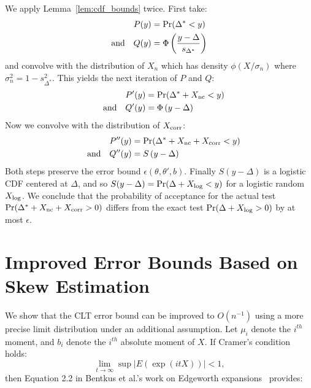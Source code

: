 \documentclass[twoside]{article} \usepackage{aistats2017}
\begin{document}
We apply Lemma~\ref{lem:cdf_bounds} twice. First take:
\begin{equation}
\begin{split}
    P(y) & = {\rm Pr}(\Delta^* < y) \\
     {\rm and} \quad Q(y) & = \Phi\left(\frac{y-\Delta}{s_{\Delta^*}}\right)
\end{split}
\end{equation}
and convolve with the distribution of $X_n$ which has density $\phi(X/\sigma_n)$
where $\sigma_n^2 = 1 - s^2_{\Delta^*}$. This yields the next iteration of $P$
and $Q$:
\begin{equation}
\begin{split}
    P'(y) & = {\rm Pr}(\Delta^*+X_{\rm nc} < y) \\
    \quad {\rm and}\quad Q'(y) & = \Phi\left({y-\Delta}\right)
\end{split}
\end{equation}
Now we convolve with the distribution of $X_{\rm corr}$:
\begin{equation}
\begin{split}
    P''(y) & = {\rm Pr}(\Delta^*+X_{\rm nc}+X_{\rm corr} < y) \\
    \quad {\rm and}\quad Q''(y) & = S\left({y-\Delta}\right)
\end{split}
\end{equation}
Both steps preserve the error bound $\epsilon(\theta,\theta',b)$. Finally
$S(y-\Delta)$ is a logistic CDF centered at $\Delta$, and so $S(y-\Delta) = {\rm
Pr}(\Delta + X_{\rm log} < y)$ for a logistic random $X_{\rm log}$. We conclude
that the probability of acceptance for the actual test ${\rm Pr}(\Delta^*+X_{\rm
nc}+X_{\rm corr} > 0)$ differs from the exact test ${\rm Pr}(\Delta+X_{\rm
log} > 0)$ by at most $\epsilon$.



\section{Improved Error Bounds Based on Skew Estimation}\label{app:better_error_bound}

We show that the CLT error bound can be improved to $O(n^{-1})$ 
using a more precise limit distribution under an additional assumption. Let
$\mu_i$ denote the $i^{th}$ moment, and $b_i$ denote the $i^{th}$ absolute
moment of $X$. If Cramer's condition holds:
\begin{equation}\label{eq:cramers_condition}
    \lim_{t \to \infty} \sup |E(\exp(i t X))| < 1,
\end{equation}
then Equation 2.2 in Bentkus et al.'s work on Edgeworth
expansions~\citep{Bentkus97} provides:
\end{document}
